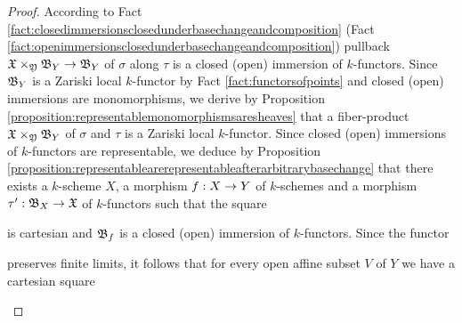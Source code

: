 \begin{proof}
According to Fact \ref{fact:closedimmersionsclosedunderbasechangeandcomposition} (Fact \ref{fact:openimmersionsclosedunderbasechangeandcomposition}) pullback $\fX\times_{\fY}\fB_Y\ra \fB_Y$ of $\sigma$ along $\tau$ is a closed (open) immersion of $k$-functors. Since $\fB_Y$ is a Zariski local $k$-functor by Fact \ref{fact:functorsofpoints} and closed (open) immersions are monomorphisms, we derive by Proposition \ref{proposition:representablemonomorphismsaresheaves} that a fiber-product $\fX\times_{\fY}\fB_Y$ of $\sigma$ and $\tau$ is a Zariski local $k$-functor. Since closed (open) immersions of $k$-functors are representable, we deduce by Proposition \ref{proposition:representablearerepresentableafterarbitrarybasechange} that there exists a $k$-scheme $X$, a morphism $f:X\ra Y$ of $k$-schemes and a morphism $\tau':\fB_X\ra \fX$ of $k$-functors such that the square
\begin{center}
\end{center}
is cartesian and $\fB_f$ is a closed (open) immersion of $k$-functors. Since the functor
\begin{center}
\end{center}
preserves finite limits, it follows that for every open affine subset $V$ of $Y$ we have a cartesian square
\begin{center}
\begin{tikzpicture}
[description/.style={fill=white,inner sep=2pt}]

\end{tikzpicture}
\end{center}
\end{proof}
